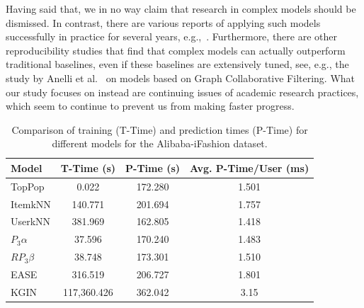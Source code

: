 \documentclass[sigconf,natbib=true,nonacm]{acmart}
\begin{document}
Having said that, we in no way claim that research in complex models should be dismissed. In contrast, there are various reports of applying such models successfully in practice for several years, e.g.,~\cite{Covingon2016Youtube,DBLP:journals/aim/SteckBELRB21}. Furthermore, there are other reproducibility studies that find that complex models can actually outperform traditional baselines, even if these baselines are extensively tuned, see, e.g., the study by Anelli et al.~\cite{Anelli2023Myth} on models based on Graph Collaborative Filtering. What our study focuses on instead are continuing issues of academic research practices, which seem to continue to prevent us from making faster progress.



\begin{table}[h!]
\centering
\caption{Comparison of training (T-Time) and prediction times (P-Time) for different models for the Alibaba-iFashion dataset.}
\begin{tabular}{l|c|c|c}
Model      & T-Time (s)    & P-Time (s)     & Avg. P-Time/User (ms) \\ \hline
TopPop          & 0.022         & 172.280        & 1.501 \\
ItemkNN         & 140.771       & 201.694        & 1.757 \\
UserkNN         & 381.969       & 162.805        & 1.418 \\
$P_{3}\alpha$   & 37.596        & 170.240        & 1.483 \\
$RP_{3}\beta$   & 38.748        & 173.301        & 1.510 \\
EASE            & 316.519       & 206.727        & 1.801 \\
KGIN            & 117,360.426   & 362.042        & 3.15 \\
\end{tabular}
\label{tab:performance_metrics-KGIN}
\end{table}
\end{document}
